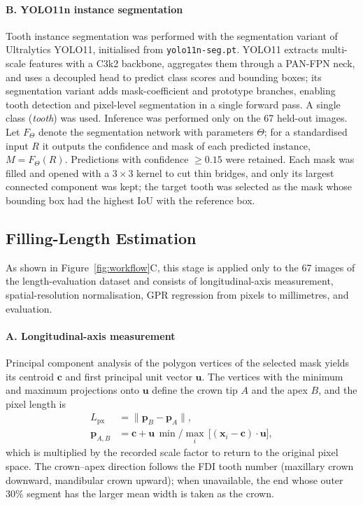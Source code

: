 \paragraph{B. YOLO11n instance segmentation}
Tooth instance segmentation was performed with the segmentation variant of
Ultralytics YOLO11, initialised from \texttt{yolo11n-seg.pt}. YOLO11 extracts
multi-scale features with a C3k2 backbone, aggregates them through a PAN-FPN
neck, and uses a decoupled head to predict class scores and bounding boxes; its
segmentation variant adds mask-coefficient and prototype branches, enabling
tooth detection and pixel-level segmentation in a single forward pass. A single
class (\textit{tooth}) was used. Inference was performed only on the 67 held-out
images. Let $F_\Theta$ denote the segmentation network with parameters $\Theta$;
for a standardised input $R$ it outputs the confidence and mask of each predicted
instance, $M = F_\Theta(R)$. Predictions with confidence $\ge 0.15$ were retained.
Each mask was filled and opened with a $3\times3$ kernel to cut thin bridges, and
only its largest connected component was kept; the target tooth was selected as
the mask whose bounding box had the highest IoU with the reference box.

\subsection{Filling-Length Estimation}

As shown in Figure~\ref{fig:workflow}C, this stage is applied only to the 67
images of the length-evaluation dataset and consists of longitudinal-axis
measurement, spatial-resolution normalisation, GPR regression from pixels to
millimetres, and evaluation.

\paragraph{A. Longitudinal-axis measurement}
Principal component analysis of the polygon vertices of the selected mask yields
its centroid $\mathbf{c}$ and first principal unit vector $\mathbf{u}$. The
vertices with the minimum and maximum projections onto $\mathbf{u}$ define the
crown tip $A$ and the apex $B$, and the pixel length is
\begin{equation}
\begin{aligned}
L_{\text{px}} &= \lVert \mathbf{p}_B - \mathbf{p}_A \rVert,\\
\mathbf{p}_{A,B} &= \mathbf{c} + \mathbf{u}\,\min/\max_i\,\big[(\mathbf{x}_i-\mathbf{c})\cdot\mathbf{u}\big],
\end{aligned}
\label{eq:lpx}
\end{equation}
which is multiplied by the recorded scale factor to return to the original pixel
space. The crown--apex direction follows the FDI tooth number (maxillary crown
downward, mandibular crown upward); when unavailable, the end whose outer 30\%
segment has the larger mean width is taken as the crown.


